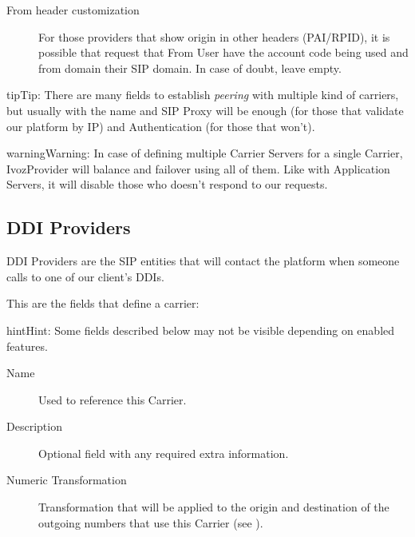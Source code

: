 \documentclass[letterpaper,10pt,english]{sphinxmanual}
\begin{document}
\begin{description}
\item[{From header customization}] \leavevmode{}\label{administration_portal/brand/providers/carriers:term-from-header-customization}
For those providers that show origin in other headers (PAI/RPID), it is
possible that request that From User have the account code being used
and from domain their SIP domain. In case of doubt, leave empty.

\end{description}

\begin{notice}{tip}{Tip:}
There are many fields to establish \emph{peering} with multiple kind of
carriers, but usually with the name and SIP Proxy will be enough (for
those that validate our platform by IP) and Authentication (for those that
won't).
\end{notice}

\begin{notice}{warning}{Warning:}
In case of defining multiple Carrier Servers for a single
Carrier, IvozProvider will balance and failover using all of them.
Like with Application Servers, it will disable those who doesn't respond to
our requests.
\end{notice}


\subsection{DDI Providers}
\label{administration_portal/brand/providers/ddi_providers:ddi-providers}\label{administration_portal/brand/providers/ddi_providers::doc}
DDI Providers are the SIP entities that will contact the platform when someone calls to one of our client's DDIs.

This are the fields that define a carrier:

\begin{notice}{hint}{Hint:}
Some fields described below may not be visible depending on enabled features.
\end{notice}
\begin{description}
\item[{Name}] \leavevmode{}\label{administration_portal/brand/providers/ddi_providers:term-name}
Used to reference this Carrier.

\item[{Description}] \leavevmode{}\label{administration_portal/brand/providers/ddi_providers:term-description}
Optional field with any required extra information.

\item[{Numeric Transformation}] \leavevmode{}\label{administration_portal/brand/providers/ddi_providers:term-numeric-transformation}
Transformation that will be applied to the origin and destination of the
outgoing numbers that use this Carrier
(see {\hyperref[administration_portal/brand/settings/numeric_transformations:numeric\string-transformations]{}}).

\end{description}
\end{document}
